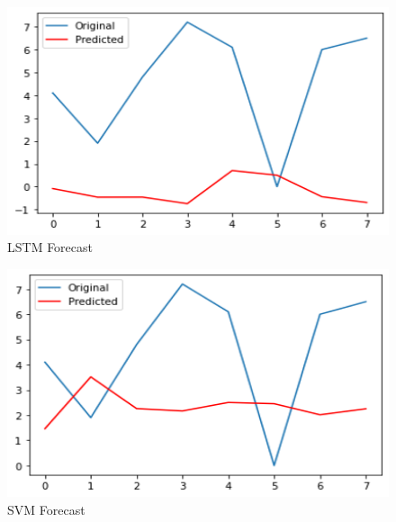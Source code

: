 \documentclass[12pt,italian, twoside]{report}
\begin{document}
\begin{figure}[t]
	\centering
	\includegraphics[width = 130mm]{immagini/lstm.png}
	\caption{LSTM Forecast}
	\label{fig:LSTM}
\end{figure}
\begin{figure}[t]
	\centering
	\includegraphics[width = 130mm]{immagini/svm.png}
	\caption{SVM Forecast}
	\label{fig:SVM}
\end{figure}
\end{document}
